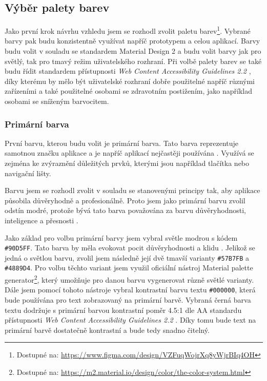 \subsection{Výběr palety barev}

Jako první krok návrhu vzhledu jsem se rozhodl zvolit paletu barev\footnote{Dostupné na: \href{https://www.figma.com/design/VZFuqWojrXq8yWjrBIq4OH}{https://www.figma.com/design/VZFuqWojrXq8yWjrBIq4OH}}. Vybrané barvy pak budu konzistentně využívat napříč prototypem a celou aplikací. Barvy budu volit v souladu se standardem Material Design 2 a budu volit barvy jak pro světlý, tak pro tmavý režim uživatelského rozhraní. Při volbě palety barev se také budu řídit standardem přístupnosti \textit{Web Content Accessibility Guidelines 2.2} \cite{WCAG22}, díky kterému by mělo být uživatelské rozhraní dobře použitelné napříč různými zařízeními a také použitelné osobami se zdravotním postižením, jako například osobami se sníženým barvocitem.

\subsubsection{Primární barva}

První barvu, kterou budu volit je primární barva. Tato barva reprezentuje samotnou značku aplikace a je napříč aplikací nejčastěji používána \cite{MaterialDesignColorSystem}. Využívá se zejména ke zvýraznění důležitých prvků, kterými jsou například tlačítka nebo navigační lišty.

Barvu jsem se rozhodl zvolit v souladu se stanovenými principy tak, aby aplikace působila důvěryhodně a profesionálně. Proto jsem jako primární barvu zvolil odstín modré, protože bývá tato barva považována za barvu důvěryhodnosti, inteligence a přesnosti \cite{NURColors}.

Jako základ pro volbu primární barvy jsem vybral světle modrou s kódem \texttt{\#90D5FF}. Tato barva by měla evokovat pocit důvěryhodnosti a klidu \cite{FigmaLightBlue}. Jelikož se jedná o světlou barvu, zvolil jsem následně její dvě tmavší varianty \texttt{\#57B7FB} a \texttt{\#4889D4}. Pro volbu těchto variant jsem využil oficiální nástroj Material palette generator\footnote{Dostupné na: \href{https://m2.material.io/design/color/the-color-system.html}{https://m2.material.io/design/color/the-color-system.html}}, který umožňuje pro danou barvu vygenerovat různě světlé varianty. Dále jsem pomocí tohoto nástroje vybral kontrastní barvu textu \texttt{\#000000}, která bude používána pro text zobrazovaný na primární barvě. Vybraná černá barva textu dodržuje s primární barvou kontrastní poměr 4.5:1 dle AA standardu přístupnosti \textit{Web Content Accessibility Guidelines 2.2} \cite{WCAG22}. Díky tomu bude text na primární barvě dostatečně kontrastní a bude tedy snadno čitelný.

